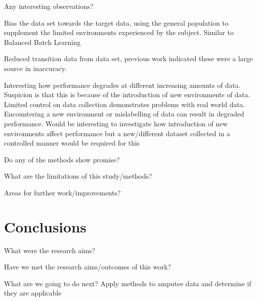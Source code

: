 Any interesting observations?

Bias the data set towards the target data, using the general population to supplement the limited environments experienced by the subject. Similar to Balanced Batch Learning \cite{Cruciani2020}

Reduced transition data from data set, previous work indicated these were a large source in inaccuracy.

Interesting how performance degrades at different increasing amounts of data. Suspicion is that this is because of the introduction of new environments of data. Limited control on data collection demonstrates problems with real world data. Encountering a new environment or mislabelling of data can result in degraded performance. Would be interesting to investigate how introduction of new environments affect performance but a new/different dataset collected in a controlled manner would be required for this

Do any of the methods show promise?

What are the limitations of this study/methods?

Areas for further work/improvements?

\section{Conclusions}
What were the research aims?

Have we met the research aims/outcomes of this work?

What are we going to do next? Apply methods to amputee data and determine if they are applicable